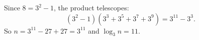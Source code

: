 Since $8=3^2-1$, the product telescopes:
\[\left(3^2-1\right)\left(3^3+3^5+3^7+3^9\right)=3^{11}-3^3.\]
So $n=3^{11}-27+27=3^{11}$ and $\log_3n=\boxed{11}$.
